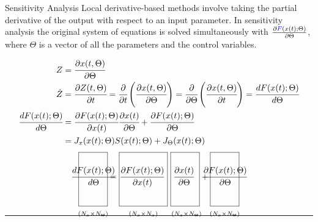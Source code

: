 \documentclass[8pt]{beamer}
\newcommand*{\claps}[1]{\hbox to 0pt{\hss#1\hss}}
\newcommand*{\mat}[1]{\boldsymbol{\mathrm{#1}}}
\newcommand*{\subdims}[3]{\clap{\raisebox{#1}[0pt][0pt]{$\scriptstyle(#2 \times #3)$}}}
\begin{document}
	\begin{frame}[fragile]{Sensitivity Analysis}
		Local derivative-based methods involve taking the partial derivative of the output with respect to an input parameter. In sensitivity analysis the original system of equations is solved simultaneously with $\frac{\partial \textcolor{blue}{F}(x(t);\Theta)}{\partial \Theta}$, where $\Theta$ is a vector of all the parameters and the control variables.
		
		\small{
			\begin{align*}
				Z &= \cfrac{\partial x(t,\Theta)}{\partial \Theta} \nonumber \\
				\dot{Z}  &= \cfrac{\partial Z(t,\Theta)}{\partial t} = \cfrac{\partial }{\partial t} \left( \cfrac{\partial x(t,\Theta)}{\partial \Theta} \right) = \cfrac{\partial }{\partial \Theta} \left( \cfrac{\partial x(t,\Theta)}{\partial t} \right) = \cfrac{d F(x(t);\Theta)}{d \Theta} \\
				\cfrac{d F(x(t);\Theta)}{d \Theta} &=  \cfrac{\partial F(x(t);\Theta)}{\partial x(t)} \cfrac{\partial x(t)}{\partial \Theta} + \cfrac{\partial F(x(t);\Theta)}{\partial \Theta}  \\
				& = J_x(x(t);\Theta)S(x(t);\Theta) + J_\Theta(x(t);\Theta)
			\end{align*}
	}
	\tiny{
		\[
		\framebox[1.2cm]{\claps{\raisebox{0pt}[1.0cm][1.0cm]{$ {\cfrac{d F(x(t);\Theta)}{d\Theta}} $}}\subdims{-1.5cm} {N_x} {N_\Theta}} =
		\framebox[2.0cm]{\claps{\raisebox{0pt}[1.0cm][1.0cm]{$ {\cfrac{\partial F(x(t);\Theta)}{\partial x(t)}} $} }\subdims{-1.5cm} {N_x} {N_x}} \ 
		\framebox[1.2cm]{\claps{\raisebox{0pt}[1.0cm][1.0cm]{$ {\cfrac{\partial x(t)}{\partial \Theta}}$}}  \subdims{-1.5cm} {N_x} {N_\Theta}} + 
		\framebox[1.2cm]{\claps{\raisebox{0pt}[1.0cm][1.0cm]{$ {\cfrac{\partial F(x(t);\Theta)}{\partial \Theta}}$}}\subdims{-1.5cm} {N_x} {N_\Theta}}
		\]}
	
	\vspace*{0.5cm}
	\hrule
	
	\end{frame}
	
\end{document}
